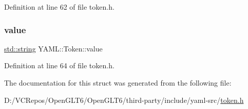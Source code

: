 Definition at line 62 of file token.\+h.

\mbox{\label{struct_y_a_m_l_1_1_token_a95b3680bf58a94bd7b9b2dca41dc0fd9}} 
\subsubsection{\texorpdfstring{value}{value}}
{\footnotesize\ttfamily \mbox{\hyperlink{glad_8h_ac83513893df92266f79a515488701770}{std\+::string}} Y\+A\+M\+L\+::\+Token\+::value}



Definition at line 64 of file token.\+h.



The documentation for this struct was generated from the following file\+:\begin{DoxyCompactItemize}
\item 
D\+:/\+V\+C\+Repos/\+Open\+G\+L\+T6/\+Open\+G\+L\+T6/third-\/party/include/yaml-\/src/\mbox{\hyperlink{token_8h}{token.\+h}}\end{DoxyCompactItemize}
